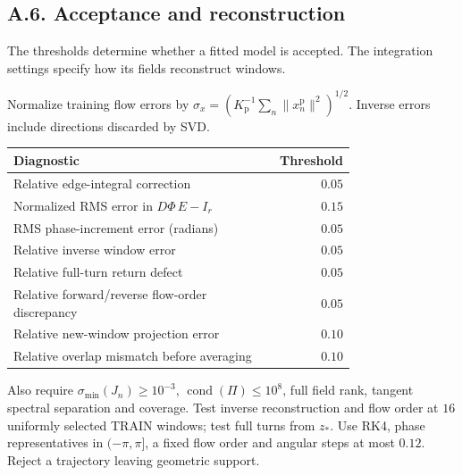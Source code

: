 \documentclass[11pt,a4paper]{article}
\begin{document}
\subsection*{A.6. Acceptance and reconstruction}
\label{app:reconstruction}
The thresholds determine whether a fitted model is accepted.
The integration settings specify how its fields reconstruct windows.

Normalize training flow errors by
$\sigma_x=(K_{\mathrm p}^{-1}\sum_n\|x_n^{\mathrm p}\|^2)^{1/2}$.
Inverse errors include directions discarded by SVD.
\begin{center}
\begin{tabular}{@{}p{0.76\linewidth}r@{}}
\toprule
Diagnostic & Threshold\\
\midrule
Relative edge-integral correction & $0.05$\\
Normalized RMS error in $D\Phi\,E-I_r$ & $0.15$\\
RMS phase-increment error (radians) & $0.05$\\
Relative inverse window error & $0.05$\\
Relative full-turn return defect & $0.05$\\
Relative forward/reverse flow-order discrepancy & $0.05$\\
Relative new-window projection error & $0.10$\\
Relative overlap mismatch before averaging & $0.10$\\
\bottomrule
\end{tabular}
\end{center}
Also require $\sigma_{\min}(J_n)\ge10^{-3}$,
$\operatorname{cond}(\Pi)\le10^8$, full field rank, tangent spectral
separation and coverage. Test inverse reconstruction and flow order at
$16$ uniformly selected TRAIN windows; test full turns from $z_*$.
Use RK4, phase representatives in $(-\pi,\pi]$, a fixed flow order and
angular steps at most $0.12$. Reject a trajectory leaving geometric support.
\end{document}
